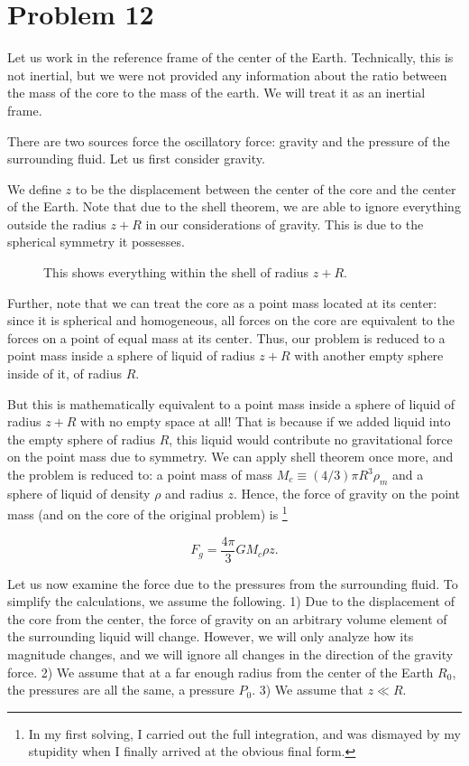 \documentclass[12pt]{article}
\title{}
\date{}
\author{Jacob H. Nie}
\begin{document}
\section*{Problem 12}

Let us work in the reference frame of the center of the Earth.  Technically, this is not inertial, but we were not provided any information about the ratio between the mass of the core to the mass of the earth.  We will treat it as an inertial frame.

There are two sources force the oscillatory force: gravity and the pressure of the surrounding fluid.  Let us first consider gravity. 

We define  $z$ to be the displacement between the center of the core and the center of the Earth.  Note that due to the shell theorem, we are able to ignore everything outside the radius $z+R$ in our considerations of gravity.  This is due to the spherical symmetry it possesses.

\begin{figure}[ht]
	\centering
	\caption{This shows everything within the shell of radius $z+R.$}
\end{figure}

Further, note that we can treat the core as a point mass located at its center: since it is spherical and homogeneous, all forces on the core are equivalent to the forces on a point of equal mass at its center.  Thus, our problem is reduced to a point mass inside a sphere of liquid of radius $z+R$ with another empty sphere inside of it, of radius $R$.  

But this is mathematically equivalent to a point mass inside a sphere of liquid of radius $z+R$ with no empty space at all!  That is because if we added liquid into the empty sphere of radius $R$, this liquid would contribute no gravitational force on the point mass due to symmetry.  We can apply shell theorem once more, and the problem is reduced to: a point mass of mass $M_c \equiv (4/3)\pi R^3 \rho_m$ and a sphere of liquid of density $\rho$ and radius $z.$  Hence, the force of gravity on the point mass (and on the core of the original problem) is
\footnote{
	In my first solving, I carried out the full integration, and was dismayed by my stupidity when I finally arrived at the obvious final form.
}


\begin{equation}
	F_g =  \frac{4\pi}{3}GM_c\rho z.
\end{equation}

Let us now examine the force due to the pressures from the surrounding fluid.  To simplify the calculations, we assume the following.  1) Due to the displacement of the core from the center, the force of gravity on an arbitrary volume element of the surrounding liquid will change.  However, we will only analyze how its magnitude changes, and we will ignore all changes in the direction of the gravity force.  2) We assume that at a far enough radius from the center of the Earth $R_0$, the pressures are all the same, a pressure $P_0$.  3) We assume that $z \ll R$.  
\end{document}

